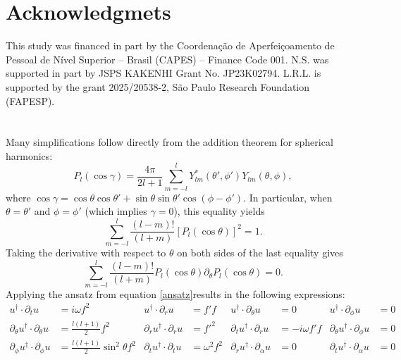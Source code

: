 \documentclass[aps,prd,superscriptaddress,notitlepage,11pt,final,longbibliography,nofootinbib]{revtex4-1}
\newcommand{\be}{\begin{equation}}
\newcommand{\ee}{\end{equation}}
\numberwithin{equation}{section}
\begin{document}
\section*{Acknowledgmets}
This study was financed in part by the Coordenação de Aperfeiçoamento de Pessoal de Nível Superior -- Brasil (CAPES) -- Finance Code 001. N.S. was supported in part by JSPS KAKENHI Grant No. JP23K02794. L.R.L. is supported by the grant 2025/20538-2, São Paulo Research Foundation (FAPESP).
\appendix
\section{}
\label{appendA}

Many simplifications follow directly from the addition theorem for spherical harmonics:
\be
P_l(\cos\gamma)=\frac{4\pi}{2l+1}\sum_{m=-l}^lY^*_{lm}(\theta',\phi')Y_{lm}(\theta,\phi),\nonumber
\ee
where $\cos\gamma=\cos\theta\cos\theta'+\sin\theta\sin\theta'\cos(\phi-\phi')$. In particular, when $\theta=\theta'$ and $\phi=\phi'$ (which implies $\gamma=0$), this equality yields$$\sum_{m=-l}^l\frac{(l-m)!}{(l+m)}[P_l(\cos\theta)]^2=1.$$ Taking the derivative with respect to $\theta$ on both sides of the last equality gives
\be
\sum_{m=-l}^l\frac{(l-m)!}{(l+m)}P_l(\cos\theta)\partial_{\theta}P_l(\cos\theta)=0. \label{a3}
\ee
Applying the ansatz from equation \eqref{ansatz}results in the following expressions:
\begin{align}
u^{\dagger}\cdot \partial_tu&=i\omega f^2& u^{\dagger}\cdot \partial_ru&=f'f & u^{\dagger}\cdot \partial_{\theta} u&=0& u^{\dagger}\cdot \partial_{\phi} u&=0\nonumber\\
\partial_{\theta}u^{\dagger}\cdot \partial_{\theta}u&=\frac{l(l+1)}{2}f^2& \partial_ru^{\dagger}\cdot \partial_ru&=f'^2& \partial_{t}u^{\dagger}\cdot \partial_{r}u&=-i\omega f'f&\partial_{\theta}u^{\dagger}\cdot \partial_{\phi}u &=0\nonumber\\
\partial_{\phi}u^{\dagger}\cdot \partial_{\phi}u&=\frac{l(l+1)}{2}\sin^2\theta f^2&\partial_{t}u^{\dagger}\cdot \partial_{t}u &=\omega^2 f^2&\partial_ru^{\dagger}\cdot \partial_{\alpha}u&=0&\partial_tu^{\dagger}\cdot \partial_{\alpha}u&=0\nonumber
\end{align}
\end{document}
